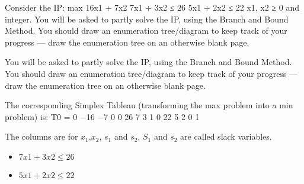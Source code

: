 Consider the IP:
max 16x1 + 7x2
7x1 + 3x2 ≤ 26
5x1 + 2x2 ≤ 22
x1, x2 ≥ 0 and integer.
You will be asked to partly solve the IP, using the Branch and Bound
Method. You should draw an enumeration tree/diagram to keep
track of your progress — draw the enumeration tree on an otherwise
blank page.


You will be asked to partly solve the IP, using the Branch and Bound Method.
You should draw an enumeration tree/diagram to keep track of your
progress — draw the enumeration tree on an otherwise blank page.
\begin{frame}
The corresponding Simplex Tableau (transforming the max problem into a
min problem) is:
T0 =
0 −16 −7 0 0
26 7 3 1 0
22 5 2 0 1

\end{frame}

\begin{frame}

The columns are for $x_1$,$x_2$, $s_1$ and $s_2$. 
$S_1$ and $s_2$ are called slack variables.

\begin{itemize}
\item $7x1 + 3x2 ≤ 26$  
\item $5x1 + 2x2 ≤ 22$

\end{itemize}
\end{frame}


